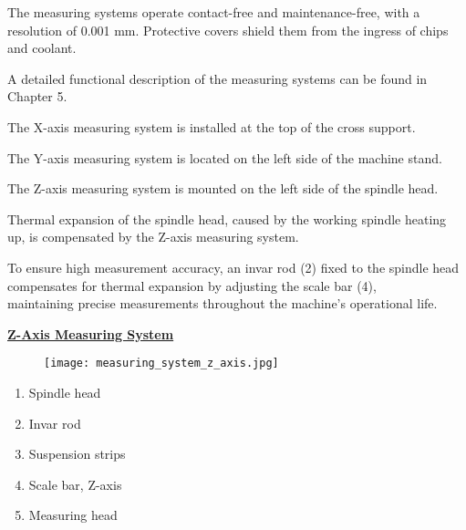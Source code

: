 The measuring systems operate contact-free and maintenance-free, with a \\resolution of 0.001 mm. Protective covers shield them from the ingress of chips and coolant.

\vspace{0.3cm}

\noindent A detailed functional description of the measuring systems can be found in Chapter 5.

\vspace{0.3cm}

\noindent The X-axis measuring system is installed at the top of the cross support.

\vspace{0.3cm}

\noindent The Y-axis measuring system is located on the left side of the machine stand.

\vspace{0.3cm}

\noindent The Z-axis measuring system is mounted on the left side of the spindle head.

\vspace{0.3cm}

\noindent Thermal expansion of the spindle head, caused by the working spindle heating up, is compensated by the Z-axis measuring system.

\vspace{0.3cm}

\noindent To ensure high measurement accuracy, an invar rod (2) fixed to the spindle head compensates for thermal expansion by adjusting the scale bar (4), \\maintaining precise measurements throughout the machine's operational life.

\vspace{0.5cm}

\noindent\textbf{\uline{Z-Axis Measuring System}}

\begin{figure}[h]
    \centering
    \texttt{[image: measuring\_system\_z\_axis.jpg]}
    \caption{}
    \label{fig:measuring_system_z}
\end{figure}

\begin{enumerate}[itemsep=1pt,parsep=0pt]
    \item Spindle head
    \item Invar rod
    \item Suspension strips
    \item Scale bar, Z-axis
    \item Measuring head
\end{enumerate}

